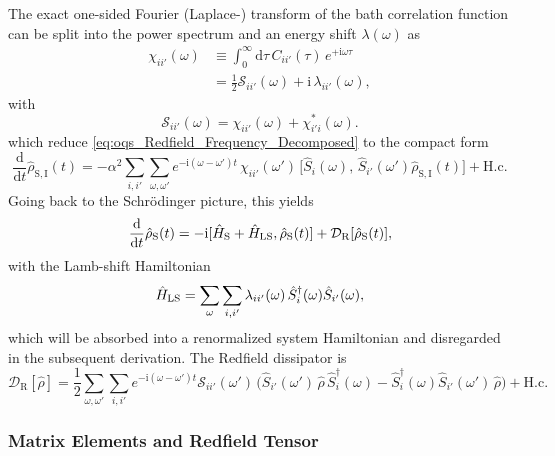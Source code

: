 \vspace{1em}
The exact one-sided Fourier (Laplace-) transform of the bath correlation function can be split into the power spectrum and an energy shift $ \lambda(\omega)$ as
\begin{align*}
	\chi_{ii'}(\omega) & \equiv \int_0^{\infty}\!\mathrm{d}\tau\, C_{ii'}(\tau)\, e^{+\mathrm{i} \omega \tau} \\
	                   & = \tfrac{1}{2}\mathcal{S}_{ii'}(\omega)+\mathrm{i}\,\lambda_{ii'}(\omega),
\end{align*}
with
\begin{equation*}
	\mathcal{S}_{ii'}(\omega)=\chi_{ii'}(\omega)+\chi_{i'i}^*(\omega).
\end{equation*}
which reduce \autoref{eq:oqs_Redfield_Frequency_Decomposed} to the compact form
\begin{equation*}
	\frac{\mathrm{d}}{\mathrm{d}t}\hat{\rho}_{\mathrm{S},\mathrm{I}}(t)
	= -\alpha^2 \sum_{i,i'} \sum_{\omega,\omega'} e^{-\mathrm{i}(\omega - \omega')t}
	\, \chi_{ii'}(\omega') \,
	\big[ \hat{S}_i(\omega),\, \hat{S}_{i'}(\omega') \hat{\rho}_{\mathrm{S},\mathrm{I}}(t) \big]
	+ \text{H.c.}
\end{equation*}
Going back to the Schrödinger picture, this yields
\begin{equation*}
	\frac{\mathrm{d}}{\mathrm{d}t}\hat{\rho}_{\mathrm{S}}(t)=-\mathrm{i}[\hat{H}_{\mathrm{S}}+\hat{H}_{\rm LS},\hat{\rho}_{\mathrm{S}}(t)]+\mathcal{D}_{\mathrm{R}}[\hat{\rho}_{\mathrm{S}}(t)],
\end{equation*}
with the Lamb-shift Hamiltonian
\begin{equation*}
	\hat{H}_{\rm LS}=\sum_{\omega}\sum_{i, i'}\lambda_{ii'}(\omega)\,
	\hat{S}_i^\dagger(\omega)\hat{S}_{i'}(\omega),
\end{equation*}
which will be absorbed into a renormalized system Hamiltonian and disregarded in the subsequent derivation. The Redfield dissipator is
\begin{equation}
	\mathcal{D}_{\mathrm{R}}[\hat{\rho}]
	=\frac{1}{2}\sum_{\omega,\omega'}\sum_{i, i'}
	e^{-\mathrm{i}(\omega-\omega')t} \mathcal{S}_{ii'}(\omega')\,
	\Big(
	\hat{S}_{i'}(\omega')\,\hat{\rho}\, \hat{S}_i^\dagger(\omega)
	- \hat{S}_i^\dagger(\omega)\hat{S}_{i'}(\omega')\,\hat{\rho}
	\Big) + \text{H.c.}
	\label{eq:oqs_Redfield_Dissipator}
\end{equation}


\subsubsection{Matrix Elements and Redfield Tensor}

